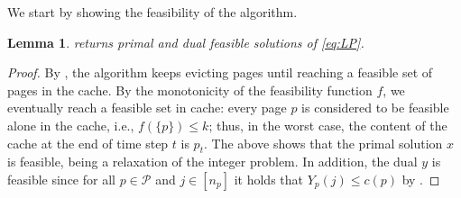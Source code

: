 \documentclass[11pt]{article}
\newcommand{\cP}{{\mathcal{P}}}
\newcommand{\cS}{{\mathcal{S}}}
\newtheorem{lemma}[thm]{Lemma}
\begin{document}
We start by showing the feasibility of the algorithm. 

	\begin{lemma}
	\label{lem:feasibilityD}
	 returns primal and dual feasible solutions of \eqref{eq:LP}.  
\end{lemma}

\begin{proof}
	By , the algorithm keeps evicting pages until reaching a feasible set of pages in the cache. By the monotonicity of the feasibility function $f$, we eventually reach a feasible set in cache: every page $p$ is considered to be feasible alone in the cache, i.e., $f(\{p\}) \leq k$; thus, in the worst case, the content of the cache at the end of time step $t$ is $p_t$. The above shows that the primal solution $x$ is feasible, being a relaxation of the integer problem.
	In addition, the dual $y$ is feasible since for all $p \in \cP$ and $j \in [n_p]$ it holds that $Y_p(j) \leq c(p)$ by . 
%		
%	
%	
\end{proof}
\end{document}

